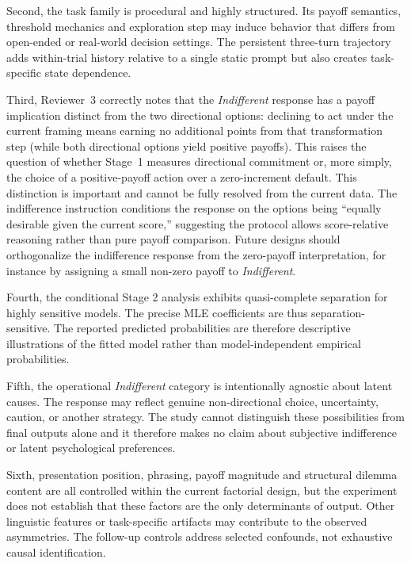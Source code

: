 \documentclass[10pt,journal,compsoc]{IEEEtran}
\begin{document}
Second, the task family is procedural and highly structured. Its payoff semantics, threshold mechanics and exploration step may induce behavior that differs from open-ended or real-world decision settings. The persistent three-turn trajectory adds within-trial history relative to a single static prompt but also creates task-specific state dependence.

Third, Reviewer~3 correctly notes that the \textit{Indifferent} response has a payoff implication distinct from the two directional options: declining to act under the current framing means earning no additional points from that transformation step (while both directional options yield positive payoffs). This raises the question of whether Stage~1 measures directional commitment or, more simply, the choice of a positive-payoff action over a zero-increment default. This distinction is important and cannot be fully resolved from the current data. The indifference instruction conditions the response on the options being ``equally desirable given the current score,'' suggesting the protocol allows score-relative reasoning rather than pure payoff comparison. Future designs should orthogonalize the indifference response from the zero-payoff interpretation, for instance by assigning a small non-zero payoff to \textit{Indifferent}.

Fourth, the conditional Stage 2 analysis exhibits quasi-complete separation for highly sensitive models. The precise MLE coefficients are thus separation-sensitive. The reported predicted probabilities are therefore descriptive illustrations of the fitted model rather than model-independent empirical probabilities.

Fifth, the operational \textit{Indifferent} category is intentionally agnostic about latent causes. The response may reflect genuine non-directional choice, uncertainty, caution, or another strategy. The study cannot distinguish these possibilities from final outputs alone and it therefore makes no claim about subjective indifference or latent psychological preferences.

Sixth, presentation position, phrasing, payoff magnitude and structural dilemma content are all controlled within the current factorial design, but the experiment does not establish that these factors are the only determinants of output. Other linguistic features or task-specific artifacts may contribute to the observed asymmetries. The follow-up controls address selected confounds, not exhaustive causal identification.
\end{document}
